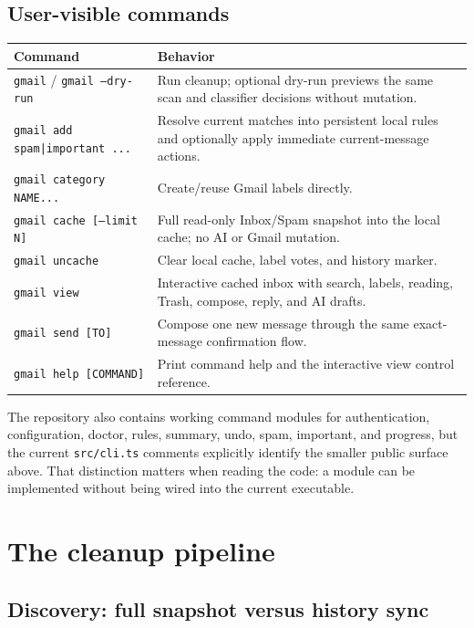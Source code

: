 \documentclass[12pt,oneside]{book}
\newcommand{\file}[1]{\nolinkurl{#1}}
\newcommand{\term}[1]{\texttt{#1}}
\begin{document}
\section{User-visible commands}

\begin{center}
\begingroup\small
\begin{tabularx}{\textwidth}{P{3.5cm}Y}
\toprule
\textbf{Command} & \textbf{Behavior} \\
\midrule
\term{gmail} / \term{gmail --dry-run} & Run cleanup; optional dry-run previews the same scan and classifier decisions without mutation. \\
\term{gmail add spam|important ...} & Resolve current matches into persistent local rules and optionally apply immediate current-message actions. \\
\term{gmail category NAME...} & Create/reuse Gmail labels directly. \\
\term{gmail cache [--limit N]} & Full read-only Inbox/Spam snapshot into the local cache; no AI or Gmail mutation. \\
\term{gmail uncache} & Clear local cache, label votes, and history marker. \\
\term{gmail view} & Interactive cached inbox with search, labels, reading, Trash, compose, reply, and AI drafts. \\
\term{gmail send [TO]} & Compose one new message through the same exact-message confirmation flow. \\
\term{gmail help [COMMAND]} & Print command help and the interactive view control reference. \\
\bottomrule
\end{tabularx}
\endgroup
\end{center}

The repository also contains working command modules for authentication, configuration, doctor, rules, summary, undo, spam, important, and progress, but the current \file{src/cli.ts} comments explicitly identify the smaller public surface above. That distinction matters when reading the code: a module can be implemented without being wired into the current executable.

\chapter{The cleanup pipeline}

\section{Discovery: full snapshot versus history sync}
\end{document}
